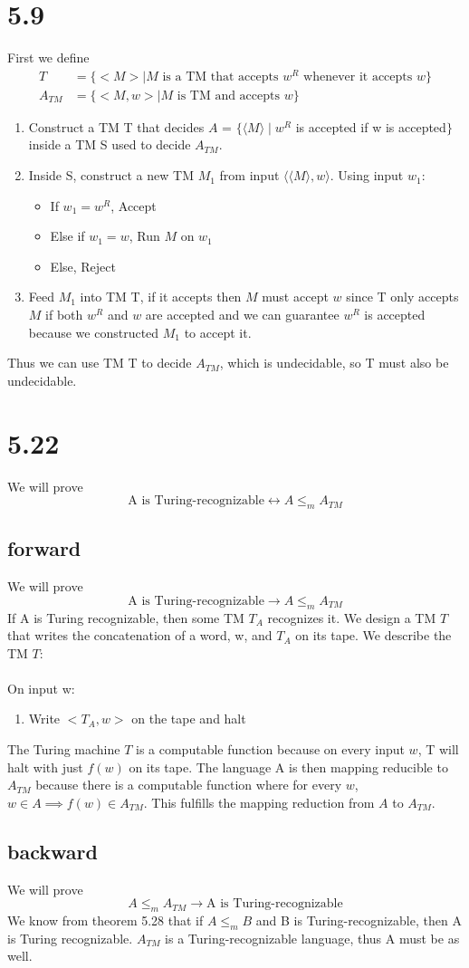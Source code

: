 \documentclass{article}
\begin{document}
\section*{5.9}

First we define
\begin{align*}
    T &= \{ <M> | M \textrm{ is a TM that accepts } w^R  \textrm{ whenever it accepts } w \}\\
    A_{TM} &= \{ <M, w> | M \textrm{ is TM and accepts } w \} 
\end{align*} 

\begin{enumerate}
    \item Construct a TM T that decides $A$ = $\{ \langle M \rangle \mid w^R$ is accepted if w is accepted$\}$ inside a TM S used to decide $A_{TM}$.
    \item Inside S, construct a new TM $M_1$ from input $\langle \langle M\rangle, w \rangle$. Using input $w_1$:
    \begin{itemize}
        \item If $w_1 = w^R$, Accept
        \item Else if $w_1 = w$, Run $M$ on $w_1$
        \item Else, Reject 
    \end{itemize}
    \item Feed ${M_1}$ into TM T, if it accepts then $M$ must accept $w$ since T only accepts ${M}$ if both $w^R$ and $w$ are accepted and we can guarantee $w^R$ is accepted because we constructed $M_1$ to accept it.
\end{enumerate}
Thus we can use TM T to decide $A_{TM}$, which is undecidable, so T must also be undecidable.

\section*{5.22}

We will prove 
$$
\textrm{A is Turing-recognizable} \leftrightarrow A \leq_m A_{TM}
$$

\subsection*{forward}
We will prove
$$\textrm{A is Turing-recognizable} \rightarrow A \leq_m A_{TM}$$
If A is Turing recognizable, then some TM $T_A$ recognizes it. We design a TM $T$ that writes the concatenation of a word, w, and $T_A$ on its tape. We describe the TM $T$:\\\\
On input w:
\begin{enumerate}
    \item Write $<T_A, w>$ on the tape and halt
\end{enumerate}
The Turing machine $T$ is a computable function because on every input $w$, T will halt with just $f(w)$ on its tape. The language A is then mapping reducible to $A_{TM}$ because there is a computable function where for every $w$, $w\in A \implies f(w) \in A_{TM}$. This fulfills the mapping reduction from $A$ to $A_{TM}$.

\subsection*{backward}
We will prove
$$A \leq_m A_{TM} \rightarrow \textrm{A is Turing-recognizable}$$
We know from theorem 5.28 that if $A \leq_m B$ and B is Turing-recognizable, then A is Turing recognizable. $A_{TM}$ is a Turing-recognizable language, thus A must be as well.
\end{document}
